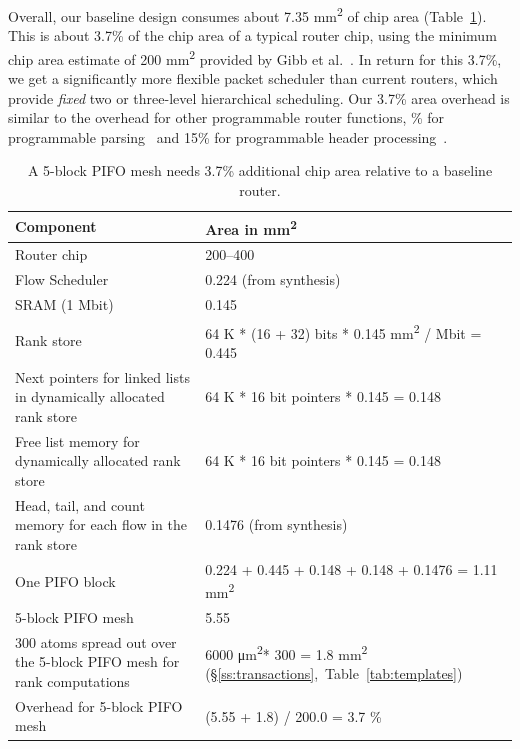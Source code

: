 Overall, our baseline design consumes about 7.35 \si{\milli\metre\squared} of
chip area (Table~\ref{tab:area_overheads}). This is about 3.7\% of the chip
area of a typical router chip, using the minimum chip area estimate of 200
\si{\milli\metre\squared} provided by Gibb et al.~\cite{glen_parsing}. In
return for this 3.7\%, we get a significantly more flexible packet scheduler
than current routers, which provide {\em fixed} two or three-level hierarchical
scheduling. Our 3.7\% area overhead is similar to the overhead for other
programmable router functions, \% for programmable
parsing~\cite{glen_parsing} and 15\% for programmable header
processing~\cite{rmt}.
 
\begin{table}[!h]
  \centering
  \begin{small}
  \begin{tabular}{|p{}|p{}|}
  \hline
  Component & Area in \si{\milli\metre\squared}\\
  \hline
  Router chip & 200--400~\cite{glen_parsing} \\
  \hline
  Flow Scheduler & 0.224 (from synthesis) \\
  \hline
  SRAM (1 Mbit) & 0.145~\cite{sram_estimate} \\
  \hline
  Rank store & 64 K * (16 + 32) bits * 0.145 \si{\milli\metre\squared} / Mbit = 0.445 \\
  \hline
  Next pointers for linked lists in dynamically allocated rank store & 64 K * 16 bit pointers * 0.145 = 0.148 \\
  \hline
  Free list memory for dynamically allocated rank store & 64 K * 16 bit pointers * 0.145 = 0.148 \\
  \hline
  Head, tail, and count memory for each flow in the rank store & 0.1476 (from synthesis) \\
  \hline
  One PIFO block & 0.224 + 0.445 + 0.148 + 0.148 + 0.1476 = 1.11 \si{\milli\metre\squared} \\
  \hline
  5-block PIFO mesh & 5.55 \\
  \hline
  300 atoms spread out over the 5-block PIFO mesh for rank computations & 6000 \si{\micro\metre\squared}* 300 = 1.8 \si{\milli\metre\squared} (\S\ref{ss:transactions},~Table~\ref{tab:templates})\\
  \hline
  Overhead for 5-block PIFO mesh & (5.55 + 1.8) / 200.0 = 3.7 \% \\
  \hline
  \end{tabular}
\end{small}
\caption{A 5-block PIFO mesh needs 3.7\% additional chip area relative to
a baseline router.}
\label{tab:area_overheads}
\end{table}

